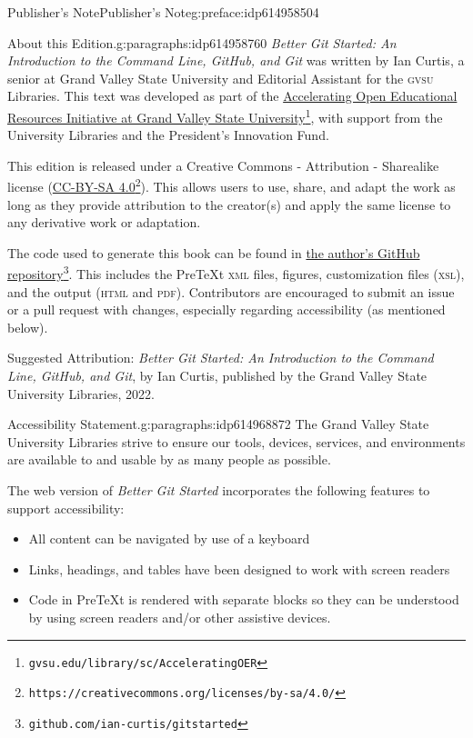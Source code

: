\documentclass[oneside,10pt,]{book}
\newcommand{\initialism}[1]{\textsc{\MakeLowercase{#1}}}
\newcommand{\pubtitle}[1]{\textsl{#1}}
\begin{document}
\begin{preface}{Publisher's Note}{}{Publisher's Note}{}{}{g:preface:idp614958504}
\begin{paragraphs}{About this Edition.}{g:paragraphs:idp614958760}%
\pubtitle{Better Git Started: An Introduction to the Command Line, GitHub, and Git} was written by Ian Curtis, a senior at Grand Valley State University and Editorial Assistant for the \initialism{GVSU} Libraries. This text was developed as part of the \href{https://www.gvsu.edu/library/sc/AcceleratingOER}{Accelerating Open Educational Resources Initiative at Grand Valley State University}\footnote{\nolinkurl{gvsu.edu/library/sc/AcceleratingOER}\label{g:fn:idp614966056}}, with support from the University Libraries and the President's Innovation Fund.%
\par
This edition is released under a Creative Commons - Attribution - Sharealike license (\href{https://creativecommons.org/licenses/by-sa/4.0/}{CC-BY-SA 4.0}\footnote{\nolinkurl{https://creativecommons.org/licenses/by-sa/4.0/}\label{g:fn:idp614967720}}). This allows users to use, share, and adapt the work as long as they provide attribution to the creator(s) and apply the same license to any derivative work or adaptation.%
\par
The code used to generate this book can be found in \href{https://github.com/ian-curtis/gitstarted}{the author's GitHub repository}\footnote{\nolinkurl{github.com/ian-curtis/gitstarted}\label{g:fn:idp614965544}}. This includes the PreTeXt \initialism{XML} files, figures, customization files (\initialism{XSL}), and the output (\initialism{HTML} and \initialism{PDF}). Contributors are encouraged to submit an issue or a pull request with changes, especially regarding accessibility (as mentioned below).%
\par
Suggested Attribution: \pubtitle{Better Git Started: An Introduction to the Command Line, GitHub, and Git}, by Ian Curtis, published by the Grand Valley State University Libraries, 2022.%
\end{paragraphs}%
\begin{paragraphs}{Accessibility Statement.}{g:paragraphs:idp614968872}%
The Grand Valley State University Libraries strive to ensure our tools, devices, services, and environments are available to and usable by as many people as possible.%
\par
The web version of \pubtitle{Better Git Started} incorporates the following features to support accessibility:%
\begin{itemize}[label=\textbullet]
\item{}All content can be navigated by use of a keyboard%
\item{}Links, headings, and tables have been designed to work with screen readers%
\item{}Code in PreTeXt is rendered with separate blocks so they can be understood by using screen readers and\slash{}or other assistive devices.%
\end{itemize}
%
\end{paragraphs}%
\end{preface}
\end{document}
